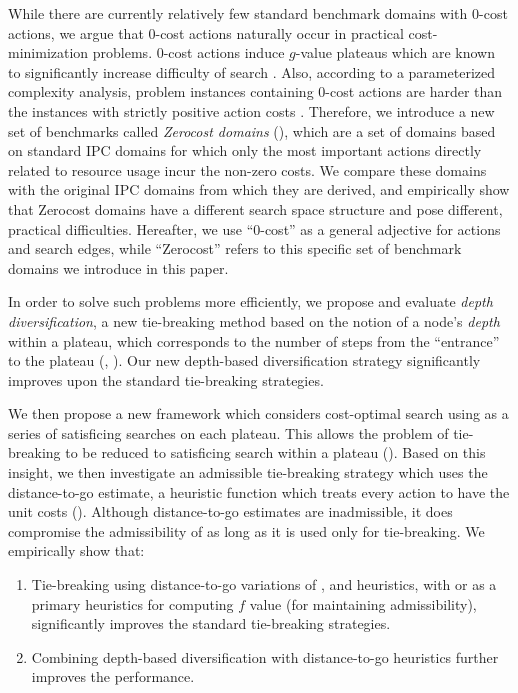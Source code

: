 While there are currently relatively few standard benchmark domains with 0-cost actions,
we argue that 0-cost actions naturally occur in
practical cost-minimization problems.
0-cost actions induce $g$-value plateaus which are known to significantly increase difficulty of search \cite{benton2010g}.
Also, according to a parameterized complexity analysis, problem instances containing 0-cost actions are harder than the instances with strictly positive action costs \cite{aghighi2015}.
Therefore, we introduce a new set of benchmarks called \emph{Zerocost domains}
(), which are a set of domains based on standard IPC domains for which only the most important actions directly related to resource usage incur the non-zero costs.
We compare these domains with the original IPC domains from which they are derived, and empirically show that 
Zerocost domains have a different search space structure and pose different, practical difficulties.
Hereafter, we use ``0-cost'' as a general adjective for actions and search edges, while ``Zerocost'' refers to this specific set of benchmark domains we introduce in this paper.

In order to solve such problems more efficiently, we propose and
evaluate \emph{depth diversification}, a new
tie-breaking method based on the notion of a node's \emph{depth} within a plateau,
which corresponds to the number of steps from the ``entrance'' to
the plateau (,
). 
Our new depth-based diversification strategy significantly improves upon the 
standard tie-breaking strategies.

We then propose a new framework which considers cost-optimal search using \astar 
as a series of satisficing searches on each plateau.
This allows the problem of tie-breaking to be reduced to satisficing search within a plateau ().
Based on this insight, we then investigate an
admissible tie-breaking strategy which uses the distance-to-go estimate, a heuristic function which treats every action
to have the unit costs ().
Although distance-to-go estimates are inadmissible,
it does compromise the admissibility of \astar as long as it is used only for tie-breaking.
% 
We empirically show that:
\begin{enumerate}
 \item Tie-breaking using distance-to-go variations of \lmcut, \mands and \ff heuristics,
       with \lmcut or \mands as a primary heuristics for computing $f$ value (for maintaining admissibility),
       significantly improves the standard tie-breaking strategies.
 \item Combining depth-based diversification with distance-to-go heuristics 
       further improves the performance.
\end{enumerate}


